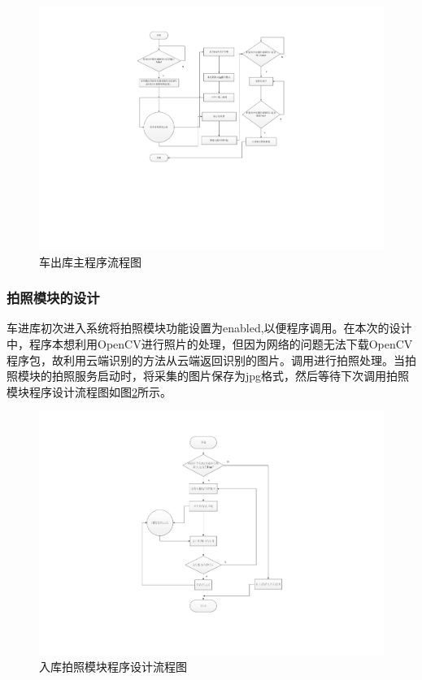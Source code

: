 \begin{figure}[htbp]
	\centering
	\includegraphics[width=\textwidth]{figure/software-2.pdf}
	\caption{车出库主程序流程图}\label{fig:车出库主程序流程图}
\end{figure}

\subsubsection{拍照模块的设计}
车进库初次进入系统将拍照模块功能设置为enabled,以便程序调用。在本次的设计中，程序本想利用OpenCV进行照片的处理，但因为网络的问题无法下载OpenCV程序包，故利用云端识别的方法从云端返回识别的图片。调用进行拍照处理。当拍照模块的拍照服务启动时，将采集的图片保存为jpg格式，然后等待下次调用拍照模块程序设计流程图如图\ref{fig:入库拍照模块程序设计流程图}所示。
 
\begin{figure}[htbp]
	\centering
	\includegraphics[width=\textwidth]{figure/software-3.pdf}
	\caption{入库拍照模块程序设计流程图}\label{fig:入库拍照模块程序设计流程图}
\end{figure}

